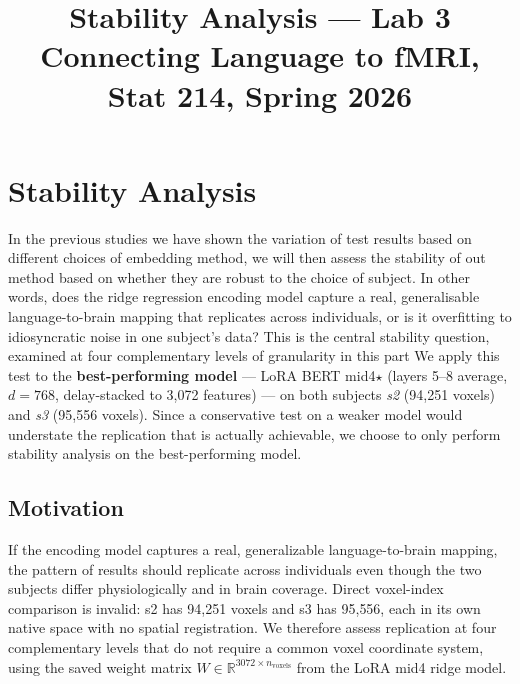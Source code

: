 \documentclass[letterpaper,12pt]{article}
\title{Stability Analysis --- Lab 3\\
       \large Connecting Language to fMRI, Stat 214, Spring 2026\vspace{-1em}}
\date{}
\begin{document}
\maketitle


\section{Stability Analysis}

In the previous studies we have shown the variation of test results based on different choices of embedding
method, we will then assess the stability of out method based on whether they are robust to the choice
of subject.
In other words, does the ridge regression encoding model capture a real,
generalisable language-to-brain mapping that replicates across individuals,
or is it overfitting to idiosyncratic noise in one subject's data?
This is the central stability question, examined at four complementary levels
of granularity in this part
We apply this test to the \textbf{best-performing model} --- LoRA BERT
mid4$\star$ (layers 5--8 average, $d = 768$, delay-stacked to 3{,}072
features) --- on both subjects \textit{s2} (94{,}251 voxels) and \textit{s3}
(95{,}556 voxels).
Since a conservative test on a
weaker model would understate the replication that is actually achievable, we choose to only perform stability analysis on the best-performing model.



\subsection{Motivation}

If the encoding model captures a real, generalizable language-to-brain
mapping, the pattern of results should replicate across individuals even
though the two subjects differ physiologically and in brain coverage.
Direct voxel-index comparison is invalid: s2 has 94{,}251 voxels and s3
has 95{,}556, each in its own native space with no spatial registration.
We therefore assess replication at four complementary levels that do not
require a common voxel coordinate system, using the saved weight matrix
$W \in \mathbb{R}^{3072 \times n_\text{voxels}}$ from the LoRA mid4
ridge model.
\end{document}
